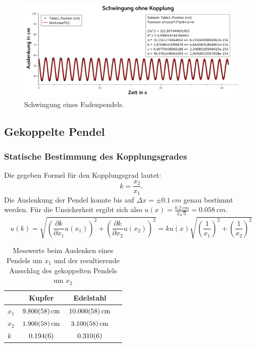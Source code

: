 \documentclass[
	a4paper,
	12pt,
	pagesize,
	ngerman
]{scrartcl}
\begin{document}
	\begin{figure}[H]
		\includegraphics[width=1\textwidth]{SchwingungOhneKopplung}
		\centering
		\caption{Schwingung eines Fadenpendels.}
		\label{SchwingungOhneKopplung}
		\centering
	\end{figure}

	\subsection{Gekoppelte Pendel}
	\subsubsection{Statische Bestimmung des Kopplungsgrades}
	Die gegeben Formel für den Kopplungsgrad lautet:
	\begin{equation}
		k = \frac{x_2}{x_1}.
	\end{equation}
	Die Auslenkung der Pendel konnte bis auf $\Delta x = \pm \SI{0,1}{cm}$ genau bestimmt werden.
	Für die Unsicherheit ergibt sich also $u(x) = \frac{\SI{0,2}{cm}}{2\sqrt{3}} = \SI{0,058}{cm}$.
	\begin{equation}
		u(k) = \sqrt{\left(\frac{\partial k}{\partial x_1}u(x_1)\right)^2+\left(\frac{\partial k}{\partial x_2}u(x_2)\right)^2} = k u(x) \sqrt{\left(\frac{1}{x_1}\right)^2+\left(\frac{1}{x_2}\right)^2}
	\end{equation}
	\begin{table}[H]
	\centering
	\begin{tabular}{ l | c | c | c |}
		& Kupfer & Edelstahl  \\ \hline
		$x_1 $ &$\SI{9,8 \pm 0,058}{cm}$&$\SI{10,0 \pm 0,058}{cm}$\\  
		$x_2 $ &$\SI{1,9 \pm 0,058}{cm}$&$\SI{3,1 \pm 0,058}{cm}$\\  \hline\hline
		$k$  & $\SI{0,194 \pm 0,006}{}$ &  $\SI{0,310 \pm 0,006}{}$ \\ \hline
	\end{tabular}
	\caption{Messwerte beim Auslenken eines Pendels um $x_1$ und der resultierende Ausschlag des gekoppelten Pendels um $x_2$}
		\label{TabelleStatischKopplungsgrad}
	\end{table}
\end{document}
